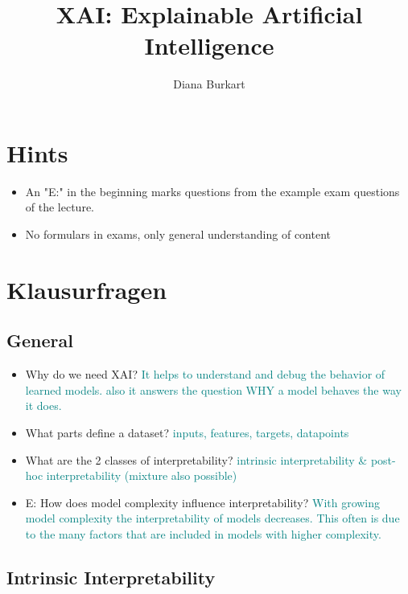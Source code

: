 \documentclass{report}
\title{XAI: Explainable Artificial Intelligence}
\author{Diana Burkart}
\newcommand{\asw}[2][teal]{}
\renewcommand{\asw}[2][teal]{\textcolor{#1}{#2}}
\begin{document}
	
	\maketitle
	\newpage
	
	\tableofcontents
	\newpage
	
	\chapter{Hints}
	
	\begin{itemize}
		\item An "E:" in the beginning marks questions from the example exam questions of the lecture.
		\item No formulars in exams, only general understanding of content
	\end{itemize}
	
	\chapter{Klausurfragen}
	
	\section{General}
	
	\begin{itemize}
		\item Why do we need XAI?
		\asw{\newline It helps to understand and debug the behavior of learned models. also it answers the question WHY a model behaves the way it does.}
		\item What parts define a dataset?
		\asw{\newline inputs, features, targets, datapoints}
		\item What are the 2 classes of interpretability?
		\asw{\newline intrinsic interpretability \& post-hoc interpretability (mixture also possible)}
		\item E: How does model complexity influence interpretability?
		\asw{\newline With growing model complexity the interpretability of models decreases. This often is due to the many factors that are included in models with higher complexity.}
	\end{itemize}
	\newpage

	\section{Intrinsic Interpretability}
	
\end{document}
